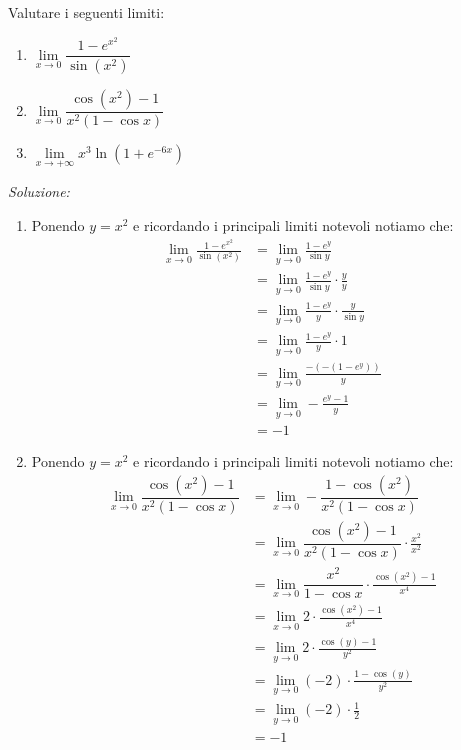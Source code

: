 \documentclass[a4paper, 12pt]{report}
\begin{document}
    \newpage

    \begin{framedprob}{}
        Valutare i seguenti limiti:
        \begin{enumerate}
            \item $\lim\limits_{x \to 0} \dfrac{1-e^{x^2}}{\sin(x^2)}$
            \item $\lim\limits_{x \to 0} \dfrac{\cos(x^2) - 1}{x^2(1-\cos x)}$
            \item $\lim\limits_{x \to +\infty} x^3 \ln (1+e^{-6x})$
        \end{enumerate}
    \end{framedprob}

    \textit{Soluzione:}

    \begin{enumerate}
        \item Ponendo $y = x^2$ e ricordando i principali limiti notevoli notiamo che:
        \[\begin{split}
            \lim\limits_{x \to 0} \frac{1-e^{x^2}}{\sin(x^2)} &= \lim\limits_{y \to 0} \frac{1-e^{y}}{\sin y}\\
            &= \lim\limits_{y \to 0} \frac{1-e^{y}}{\sin y} \cdot \frac{y}{y} \\
            &= \lim\limits_{y \to 0} \frac{1-e^{y}}{y} \cdot \frac{y}{\sin y} \\
            &= \lim\limits_{y \to 0} \frac{1-e^{y}}{y} \cdot 1 \\
            &= \lim\limits_{y \to 0} \frac{-(-(1-e^y))}{y} \\
            &= \lim\limits_{y \to 0} -\frac{e^{y}-1}{y} \\
            &= -1 
        \end{split}\]

        \item Ponendo $y = x^2$ e ricordando i principali limiti notevoli notiamo che:
        \[\begin{split}
            \lim\limits_{x \to 0} \dfrac{\cos(x^2) - 1}{x^2(1-\cos x)} &= \lim\limits_{x \to 0} -\dfrac{1-\cos(x^2)}{x^2(1-\cos x)} \\
           &= \lim\limits_{x \to 0} \dfrac{\cos(x^2) - 1}{x^2(1-\cos x)} \cdot \frac{x^2}{x^2} \\
           &= \lim\limits_{x \to 0} \dfrac{x^2}{1-\cos x} \cdot \frac{\cos(x^2) - 1}{x^4} \\
           &= \lim\limits_{x \to 0} 2 \cdot \frac{\cos(x^2) - 1}{x^4} \\
           &= \lim\limits_{y \to 0} 2 \cdot \frac{\cos(y) - 1}{y^2} \\
           &= \lim\limits_{y \to 0} (-2) \cdot \frac{1-\cos(y)}{y^2} \\
           &= \lim\limits_{y \to 0} (-2) \cdot \frac{1}{2} \\
           &= -1
        \end{split}\]


\end{enumerate}
\end{document}
